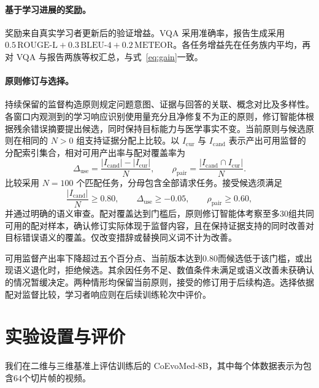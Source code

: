 \paragraph{基于学习进展的奖励。}
奖励来自真实学习者更新后的验证增益。VQA 采用准确率，报告生成采用 $0.5\,\mathrm{ROUGE\mbox{-}L}+0.3\,\mathrm{BLEU\mbox{-}4}+0.2\,\mathrm{METEOR}$。各任务增益先在任务族内平均，再对 VQA 与报告两族等权汇总，与式~\ref{eq:gain}一致。

\paragraph{原则修订与选择。}
持续保留的监督构造原则规定问题意图、证据与回答的关联、概念对比及多样性。各窗口内观测到的学习响应识别使用量充分且净修复不为正的原则，修订智能体根据残余错误摘要提出候选，同时保持目标能力与医学事实不变。当前原则与候选原则在相同的 $N>0$ 组支持证据分配上比较。以 $I_{\mathrm{cur}}$ 与 $I_{\mathrm{cand}}$ 表示产出可用监督的分配索引集合，相对可用产出率与配对覆盖率为
\begin{equation}
\Delta_{\mathrm{use}}=\frac{|I_{\mathrm{cand}}|-|I_{\mathrm{cur}}|}{N},
\qquad
\rho_{\mathrm{pair}}=\frac{|I_{\mathrm{cand}}\cap I_{\mathrm{cur}}|}{N}.
\label{eq:strategy_comparison}
\end{equation}
比较采用 $N=100$ 个匹配任务，分母包含全部请求任务。接受候选须满足
\[
\frac{|I_{\mathrm{cand}}|}{N}\geq0.80,\qquad
\Delta_{\mathrm{use}}\geq-0.05,\qquad
\rho_{\mathrm{pair}}\geq0.60,
\]
并通过明确的语义审查。配对覆盖达到门槛后，原则修订智能体考察至多30组共同可用的配对样本，确认修订实际体现于监督内容，且在保持证据支持的同时改善对目标错误语义的覆盖。仅改变措辞或替换同义词不计为改善。

可用监督产出率下降超过五个百分点、当前版本达到0.80而候选低于该门槛，或出现语义退化时，拒绝候选。其余因任务不足、数值条件未满足或语义改善未获确认的情况暂缓决定。两种情形均保留当前原则，接受的修订用于后续构造。选择依据配对监督比较，学习者响应则在后续训练轮次中评价。

\section{实验设置与评价}
\label{app:evaluation}
\label{app:3d}

我们在二维与三维基准上评估训练后的 CoEvoMed-8B，其中每个体数据表示为包含64个切片帧的视频。





